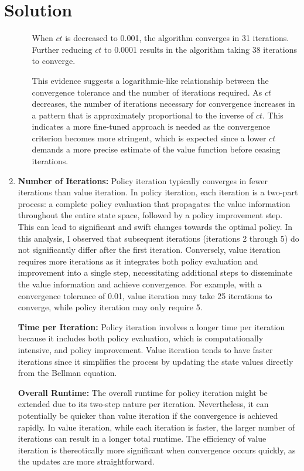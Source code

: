 \documentclass[submit]{harvardml}
\newenvironment{solution}
  {\color{blue}\section*{Solution}}
{}
\begin{document}
\begin{solution}
\begin{enumerate}
\begin{enumerate}
When \( ct \) is decreased to 0.001, the algorithm converges in 31 iterations. Further reducing \( ct \) to 0.0001 results in the algorithm taking 38 iterations to converge.

This evidence suggests a logarithmic-like relationship between the convergence tolerance and the number of iterations required. As \( ct \) decreases, the number of iterations necessary for convergence increases in a pattern that is approximately proportional to the inverse of \( ct \). This indicates a more fine-tuned approach is needed as the convergence criterion becomes more stringent, which is expected since a lower \( ct \) demands a more precise estimate of the value function before ceasing iterations.

\end{enumerate}

\item \textbf{Number of Iterations:}
Policy iteration typically converges in fewer iterations than value iteration. In policy iteration, each iteration is a two-part process: a complete policy evaluation that propagates the value information throughout the entire state space, followed by a policy improvement step. This can lead to significant and swift changes towards the optimal policy. In this analysis, I observed that subsequent iterations (iterations 2 through 5) do not significantly differ after the first iteration. Conversely, value iteration requires more iterations as it integrates both policy evaluation and improvement into a single step, necessitating additional steps to disseminate the value information and achieve convergence. For example, with a convergence tolerance of 0.01, value iteration may take 25 iterations to converge, while policy iteration may only require 5. 

\textbf{Time per Iteration:}
Policy iteration involves a longer time per iteration because it includes both policy evaluation, which is computationally intensive, and policy improvement. Value iteration tends to have faster iterations since it simplifies the process by updating the state values directly from the Bellman equation.

\textbf{Overall Runtime:}
The overall runtime for policy iteration might be extended due to its two-step nature per iteration. Nevertheless, it can potentially be quicker than value iteration if the convergence is achieved rapidly. In value iteration, while each iteration is faster, the larger number of iterations can result in a longer total runtime. The efficiency of value iteration is thereotically more significant when convergence occurs quickly, as the updates are more straightforward.


\end{enumerate}
\end{solution}
\end{document}
